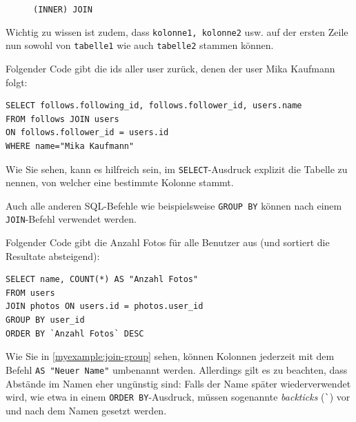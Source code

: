 \begin{figure}[H]
  \centering
  \caption{\lstinline|(INNER) JOIN|}
  \label{fig:venn-join}
\end{figure}

Wichtig zu wissen ist zudem, dass \texttt{kolonne1, kolonne2} usw. auf der ersten Zeile nun sowohl von \texttt{tabelle1} wie auch \texttt{tabelle2} stammen können.

\begin{myexample}
Folgender Code gibt die ids aller user zurück, denen der user Mika Kaufmann folgt:
\begin{lstlisting}
SELECT follows.following_id, follows.follower_id, users.name 
FROM follows JOIN users 
ON follows.follower_id = users.id 
WHERE name="Mika Kaufmann"
\end{lstlisting}

Wie Sie sehen, kann es hilfreich sein, im \lstinline|SELECT|-Ausdruck explizit die Tabelle zu nennen, von welcher eine bestimmte Kolonne stammt.
\end{myexample}

Auch alle anderen SQL-Befehle wie beispielsweise \lstinline|GROUP BY| können nach einem \lstinline|JOIN|-Befehl verwendet werden.

\begin{myexample}\label{myexample:join-group}
Folgender Code gibt die Anzahl Fotos für alle Benutzer aus (und sortiert die Resultate absteigend):
\begin{lstlisting}
SELECT name, COUNT(*) AS "Anzahl Fotos"
FROM users
JOIN photos ON users.id = photos.user_id
GROUP BY user_id
ORDER BY `Anzahl Fotos` DESC
\end{lstlisting}
\end{myexample}

\begin{mycaution}
  Wie Sie in \cref{myexample:join-group} sehen, können Kolonnen jederzeit mit dem Befehl \lstinline|AS "Neuer Name"| umbenannt werden. Allerdings gilt es zu beachten, dass Abstände im Namen eher ungünstig sind: Falls der Name später wiederverwendet wird, wie etwa in einem \lstinline|ORDER BY|-Ausdruck, müssen sogenannte \textit{backticks} (\lstinline|`|) vor und nach dem Namen gesetzt werden.
\end{mycaution}

